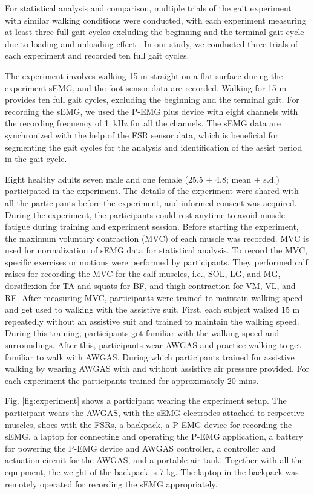 \documentclass[paper,JRM,paper]{jaciiiarticle}
\begin{document}
For statistical analysis and comparison, multiple trials of the gait experiment with similar walking conditions were conducted, with each experiment measuring at least three full gait cycles excluding the beginning and the terminal gait cycle due to loading and unloading effect \cite{22}. In our study, we conducted three trials of each experiment and recorded ten full gait cycles. 

The experiment involves walking 15 m straight on a flat surface during the experiment sEMG, and the foot sensor data are recorded. Walking for 15 m provides ten full gait cycles, excluding the beginning and the terminal gait.  For recording the sEMG, we used the P-EMG plus device with eight channels with the recording frequency of \SI{1}{\kilo\hertz} for all the channels. The sEMG data are synchronized with the help of the FSR sensor data, which is beneficial for segmenting the gait cycles for the analysis and identification of the assist period in the gait cycle. 

Eight healthy adults seven male and one female (25.5 $\pm$ 4.8; mean $\pm$ s.d.) participated in the experiment. The details of the experiment were shared with all the participants before the experiment, and informed consent was acquired. During the experiment, the participants could rest anytime to avoid muscle fatigue during training and experiment session. Before starting the experiment, the maximum voluntary contraction (MVC) of each muscle was recorded. MVC is used for normalization of sEMG data for statistical analysis. To record the MVC, specific exercises or motions were performed by participants. They performed calf raises for recording the MVC for the calf muscles, i.e., SOL, LG, and MG, dorsiflexion for TA and squats for BF, and thigh contraction for VM, VL, and RF. 
After measuring MVC, participants were trained to maintain walking speed and get used to walking with the assistive suit. First, each subject walked 15 m repeatedly without an assistive suit and trained to maintain the walking speed. During this training, participants got familiar with the walking speed and surroundings. After this, participants wear AWGAS and practice walking to get familiar to walk with AWGAS. During which participants trained for assistive walking by wearing AWGAS with and without assistive air pressure provided. For each experiment the participants trained for approximately 20 mins. 



Fig. \ref{fig:experiment} shows a participant wearing the experiment setup. The participant wears the AWGAS, with the sEMG electrodes attached to respective muscles, shoes with the FSRs, a backpack, a P-EMG device for recording the sEMG, a laptop for connecting and operating the P-EMG application, a battery for powering the P-EMG device and AWGAS controller, a controller and actuation circuit for the AWGAS, and a portable air tank. Together with all the equipment, the weight of the backpack is 7 kg. The laptop in the backpack was remotely operated for recording the sEMG appropriately.
\end{document}
